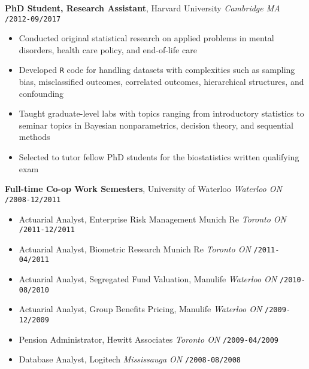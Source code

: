 \documentclass[10pt,english]{report}
\begin{document}
\vspace{1mm}

\textbf{PhD Student, Research Assistant}, Harvard University \hfill \textit{Cambridge MA} \texttt{/2012-09/2017}
\begin{itemize}
\item Conducted original statistical research on applied problems in mental disorders, health care policy, and end-of-life care
\item Developed \texttt{R} code for handling datasets with complexities such as sampling bias, misclassified outcomes, correlated outcomes, hierarchical structures, and confounding
\item Taught graduate-level labs with topics ranging from introductory statistics to seminar topics in Bayesian nonparametrics, decision theory, and sequential methods
\item Selected to tutor fellow PhD students for the biostatistics written qualifying exam
\end{itemize}

\vspace{1mm}

\textbf{Full-time Co-op Work Semesters}, University of Waterloo \hfill \textit{Waterloo ON} \texttt{/2008-12/2011}
\begin{itemize}
\item Actuarial Analyst, Enterprise Risk Management Munich Re \hfill \textit{Toronto ON} \texttt{/2011-12/2011}
\item Actuarial Analyst, Biometric Research Munich Re \hfill \textit{Toronto ON} \texttt{/2011-04/2011}
\item Actuarial Analyst, Segregated Fund Valuation, Manulife \hfill \textit{Waterloo ON} \texttt{/2010-08/2010}
\item Actuarial Analyst, Group Benefits Pricing, Manulife \hfill \textit{Waterloo ON} \texttt{/2009-12/2009}
\item Pension Administrator, Hewitt Associates \hfill \textit{Toronto ON} \texttt{/2009-04/2009}
\item Database Analyst, Logitech \hfill \textit{Mississauga ON} \texttt{/2008-08/2008}
\end{itemize}
\end{document}
